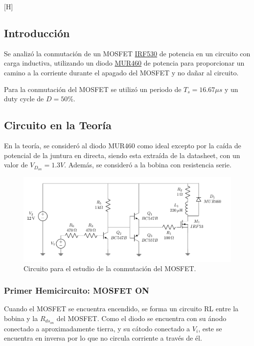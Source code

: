 %

%

[H]\subsection{Introducción}

Se analizó la conmutación de un MOSFET \href{https://www.vishay.com/docs/91019/91019.pdf}{IRF530} de potencia en un circuito con carga inductiva, utilizando un diodo \href{https://www.onsemi.com/pdf/datasheet/mur420-d.pdf}{MUR460} de potencia para proporcionar un camino a la corriente durante el apagado del MOSFET y no dañar al circuito.


Para la conmutación del MOSFET se utilizó un periodo de $T_s = 16.67 \mu s$ y un duty cycle de $D = 50 \%$.

\subsection{Circuito en la Teoría}

En la teoría, se consideró al diodo MUR460 como ideal excepto por la caída de potencial de la juntura en directa, siendo esta extraída de la datasheet, con un valor de $V_{D_{on}} = 1.3V$. Además, se consideró a la bobina con resistencia serie.

\begin{figure}[]
	\centering
	\includegraphics[width=0.7\linewidth, page=1]{ImagenesEjercicio-1/CircuitsEj1}
	\caption{Circuito para el estudio de la conmutación del MOSFET.}
	\label{ej1:fig:circuito}
\end{figure}

\subsubsection{Primer Hemicircuito: MOSFET ON}

Cuando el MOSFET se encuentra encendido, se forma un circuito RL entre la bobina y la $R_{ds_{on}}$ del MOSFET. Como el diodo se encuentra con su ánodo conectado a aproximadamente tierra, y su cátodo conectado a $V_i$, este se encuentra en inversa por lo que no circula corriente a través de él.


